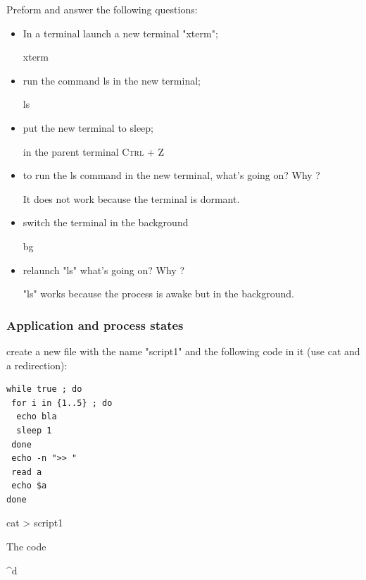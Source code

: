 \documentclass[11pt]{article}
\begin{document}
\smallskip
\noindent Preform and answer the following questions:

\begin{itemize}
 \item In a terminal launch a new terminal "xterm";
\begin{solution}
xterm
\end{solution}
 \item run the command ls  in the new terminal;
\begin{solution}
ls
\end{solution}
 \item put the new terminal to sleep;
\begin{solution}
in the parent terminal \textsc{Ctrl + Z}
\end{solution}
 \item to run the ls command in the new terminal, what's going on? Why ?
\begin{solution}
It does not work because the terminal is dormant.
\end{solution}
 \item switch the terminal in the background
\begin{solution}
bg
\end{solution}
 \item relaunch "ls" what's going on? Why ?
\begin{solution}
"ls" works because the process is awake but in the background.
\end{solution}
\end{itemize}

\subsubsection{Application and process states}

create a new file with the name "script1" and the following code in it (use cat and a redirection):

\begin{lstlisting}
while true ; do
 for i in {1..5} ; do
  echo bla
  sleep 1
 done
 echo -n ">> "
 read a
 echo $a
done
\end{lstlisting}

\begin{solution}

cat > script1

The code

\^{}d

\end{solution}
\end{document}

